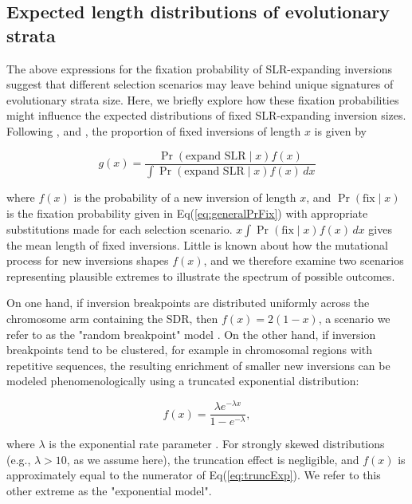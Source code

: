 \documentclass{article}[12pt]
\begin{document}
\subsection*{Expected length distributions of evolutionary strata} \label{subsec:DistFixedInv}

The above expressions for the fixation probability of SLR-expanding inversions suggest that different selection scenarios may leave behind unique signatures of evolutionary strata size. Here, we briefly explore how these fixation probabilities might influence the expected distributions of fixed SLR-expanding inversion sizes. Following \citet{vanValenLevins1968, Santos1986}, and \citet{ConnallonOlito2021}, the proportion of fixed inversions of length $x$ is given by 
\begin{linenomath*}
\begin{equation} \label{eq:generalInvSizeModel}
  g(x) = \frac{\Pr(\text{expand SLR} \mid x) f(x)} {\int \Pr(\text{expand SLR} \mid x) f(x)\,dx}
\end{equation}
\end{linenomath*}

\noindent where $f(x)$ is the probability of a new inversion of length $x$, and $\Pr(\text{fix} \mid x)$ is the fixation probability given in Eq(\ref{eq:generalPrFix}) with appropriate substitutions made for each selection scenario. $x\int \Pr(\text{fix} \mid x) f(x)\,dx$ gives the mean length of fixed inversions. Little is known about how the mutational process for new inversions shapes $f(x)$, and we therefore examine two scenarios representing plausible extremes to illustrate the spectrum of possible outcomes.

On one hand, if inversion breakpoints are distributed uniformly across the chromosome arm containing the SDR, then $f(x) = 2(1 - x)$, a scenario we refer to as the "random breakpoint" model \citep{vanValenLevins1968}. On the other hand, if inversion breakpoints tend to be clustered, for example in chromosomal regions with repetitive sequences, the resulting enrichment of smaller new inversions can be modeled phenomenologically using a truncated exponential distribution:
\begin{linenomath*}
\begin{equation} \label{eq:truncExp}
  f(x) = \frac{ \lambda e^{-\lambda x}} {1 - e^{-\lambda}},
\end{equation}
\end{linenomath*}

\noindent where $\lambda$ is the exponential rate parameter \citep{PevznerTesler2003, PengPevznerTesler2006, ChengKirkpatrick2019,ConnallonOlito2021}. For strongly skewed distributions (e.g., $\lambda > 10$, as we assume here), the truncation effect is negligible, and $f(x)$ is approximately equal to the numerator of Eq(\ref{eq:truncExp}). We refer to this other extreme as the "exponential model". 
\end{document}

